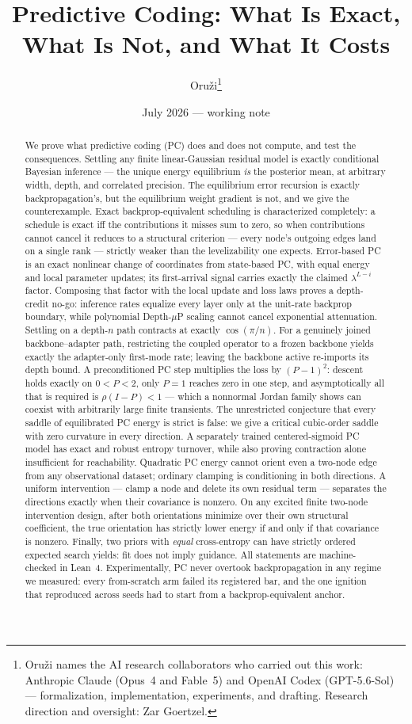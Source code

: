 \documentclass[11pt]{article}
\title{Predictive Coding: What Is Exact,\\ What Is Not, and What It Costs}
\author{Oru\v{z}i\thanks{Oru\v{z}i names the AI research collaborators who carried out
this work: Anthropic Claude (Opus~4 and Fable~5) and OpenAI Codex (GPT-5.6-Sol) ---
formalization, implementation, experiments, and drafting. Research direction and
oversight: Zar Goertzel.}}
\date{July 2026 --- working note}
\begin{document}
\maketitle

\begin{abstract}
We prove what predictive coding (PC) does and does not compute, and test the
consequences. Settling any finite linear-Gaussian residual model is exactly conditional
Bayesian inference --- the unique energy equilibrium \emph{is} the posterior mean, at
arbitrary width, depth, and correlated precision. The equilibrium error recursion is
exactly backpropagation's, but the equilibrium weight gradient is not, and we give the
counterexample. Exact backprop-equivalent scheduling is characterized completely: a
schedule is exact iff the contributions it misses sum to zero, so when contributions
cannot cancel it reduces to a structural criterion --- every node's outgoing edges land
on a single rank --- strictly weaker than the levelizability one expects. Error-based PC
is an exact nonlinear change of coordinates from state-based PC, with equal energy and
local parameter updates; its first-arrival signal carries exactly the claimed
$\lambda^{L-i}$ factor. Composing that factor with the local update and loss laws
proves a depth-credit no-go: inference rates equalize every layer only at the unit-rate
backprop boundary, while polynomial Depth-$\mu$P scaling cannot cancel exponential
attenuation. Settling on a depth-$n$ path contracts at exactly
$\cos(\pi/n)$.  For a genuinely joined backbone--adapter path, restricting the
coupled operator to a frozen backbone yields exactly the adapter-only first-mode rate;
leaving the backbone active re-imports its depth bound.  A preconditioned PC step
multiplies the loss by $(P-1)^2$: descent holds exactly on $0<P<2$, only $P=1$ reaches
zero in one step, and asymptotically all that is required is $\rho(I-P)<1$ --- which a
nonnormal Jordan family shows can coexist with arbitrarily large finite transients.
The unrestricted conjecture that every saddle of equilibrated PC energy is strict is
false: we give a critical cubic-order saddle with zero curvature in every direction.
A separately trained centered-sigmoid PC model has exact and robust entropy turnover,
while also proving contraction alone insufficient for reachability. Quadratic PC energy
cannot orient even a two-node edge from any observational dataset; ordinary clamping is
conditioning in both directions. A uniform intervention --- clamp a node and delete its
own residual term --- separates the directions exactly when their covariance is nonzero.
On any excited finite two-node intervention design, after both orientations minimize
over their own structural coefficient, the true orientation has strictly lower energy
if and only if that covariance is nonzero.
Finally, two priors with \emph{equal}
cross-entropy can have strictly ordered expected search yields: fit does not imply
guidance. All statements are machine-checked in Lean~4. Experimentally, PC never
overtook backpropagation in any regime we measured: every from-scratch arm failed its
registered bar, and the one ignition that reproduced across seeds had to start from a
backprop-equivalent anchor.
\end{abstract}
\end{document}
